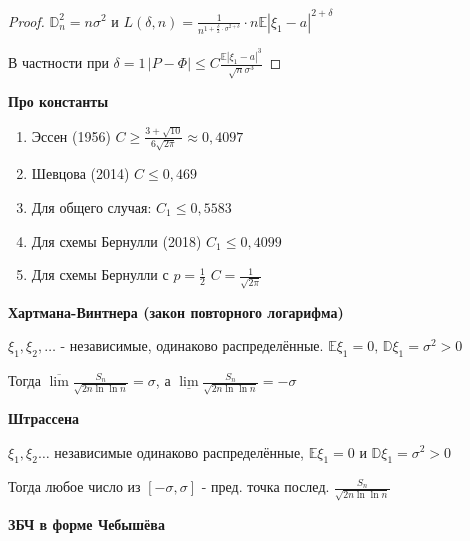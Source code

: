 \begin{proof}
    $\mathbb{D}_n^2 = n \sigma^2$ и $L (\delta, n) = \frac{1}{n^{1 + \frac{\delta}{2} \cdot \sigma^{2 + \delta}}} \cdot n \mathbb{E} |\xi_1 - a|^{2 + \delta}$

    В частности при $\delta = 1 \, |P - \Phi| \leqslant C \frac{\mathbb{E} |\xi_1 - a|^3}{\sqrt{n} \sigma^3}$
\end{proof}

\begin{remark}
    \textbf{Про константы}

    \begin{enumerate}
        \item {
            Эссен (1956) $C \geqslant \frac{3 + \sqrt{10}}{6 \sqrt{2 \pi}} \approx 0,4097$
        }
        \item {
            Шевцова (2014) $C \leqslant 0,469$
        }
        \item {
            Для общего случая: $C_1 \leqslant 0,5583$
        }
        \item {
            Для схемы Бернулли (2018) $C_1 \leqslant 0,4099$
        }
        \item {
            Для схемы Бернулли с $p = \frac{1}{2}$ $C = \frac{1}{\sqrt{2\pi}}$
        }
    \end{enumerate}
\end{remark}

\begin{theorem}
    \textbf{Хартмана-Винтнера (закон повторного логарифма)}

    $\xi_1, \xi_2, \ldots$ - независимые, одинаково распределённые. $\mathbb{E} \xi_1 = 0, \, \mathbb{D} \xi_1 = \sigma^2 > 0$

    Тогда $\overline{\lim} \frac{S_n}{\sqrt{2n \ln \ln n}} = \sigma$, а $\underline{\lim} \frac{S_n}{\sqrt{2n \ln \ln n}} = -\sigma$
\end{theorem}

\begin{theorem}
    \textbf{Штрассена} 

    $\xi_1, \xi_2 \ldots$ независимые одинаково распределённые, $\mathbb{E} \xi_1 = 0$ и $\mathbb{D} \xi_1 = \sigma^2 > 0$

    Тогда любое число из $[-\sigma, \sigma]$ - пред. точка послед. $\frac{S_n}{\sqrt{2n \ln \ln n}}$
\end{theorem}



 \textbf{ЗБЧ в форме Чебышёва}

